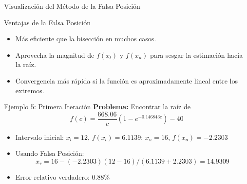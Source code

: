 \documentclass[../../main.tex]{subfiles}
\begin{document}
\begin{frame}{Visualización del Método de la Falsa Posición}
\centering
{}
\end{frame}



\begin{frame}{Ventajas de la Falsa Posición}
\begin{itemize}
  \item Más eficiente que la bisección en muchos casos.
  \item Aprovecha la magnitud de \( f(x_l) \) y \( f(x_u) \) para sesgar la estimación hacia la raíz.
  \item Convergencia más rápida si la función es aproximadamente lineal entre los extremos.
\end{itemize}
\end{frame}

\begin{frame}{Ejemplo 5: Primera Iteración}
\textbf{Problema:} Encontrar la raíz de
\[
  f(c) = \frac{668.06}{c}(1 - e^{-0.146843c}) - 40
\]
\begin{itemize}
  \item Intervalo inicial: \( x_l = 12 \), \( f(x_l) = 6.1139 \); \( x_u = 16 \), \( f(x_u) = -2.2303 \)
  \item Usando Falsa Posición:
  \[
    x_r = 16 - (-2.2303)(12 - 16)/\left(6.1139 + 2.2303\right) = 14.9309
  \]
  \item Error relativo verdadero: \( 0.88\% \)
\end{itemize}
\end{frame}
\end{document}
